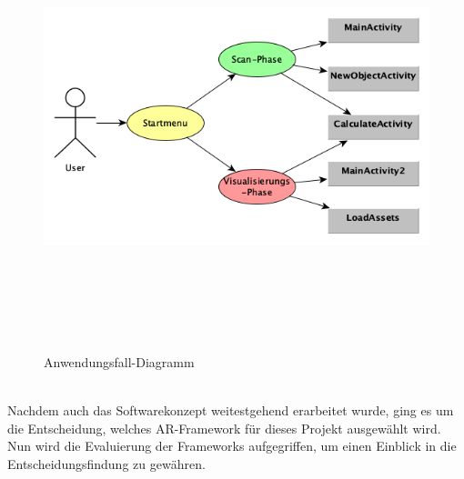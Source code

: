 \begin{figure}[hbt!]
    \centering
    \includegraphics[width=13cm,height=13cm,keepaspectratio]{3Konzeption/Bilder/Anwendungsfalldiagramm.png}
    \caption{Anwendungsfall-Diagramm}
    \label{pic:anwendungsfall}
\end{figure}
\\ 
Nachdem auch das Softwarekonzept weitestgehend erarbeitet wurde, ging es um die Entscheidung, welches \acl{AR}-Framework für dieses Projekt 
ausgewählt wird. Nun wird die Evaluierung der Frameworks aufgegriffen, um einen Einblick in die Entscheidungsfindung zu gewähren.
